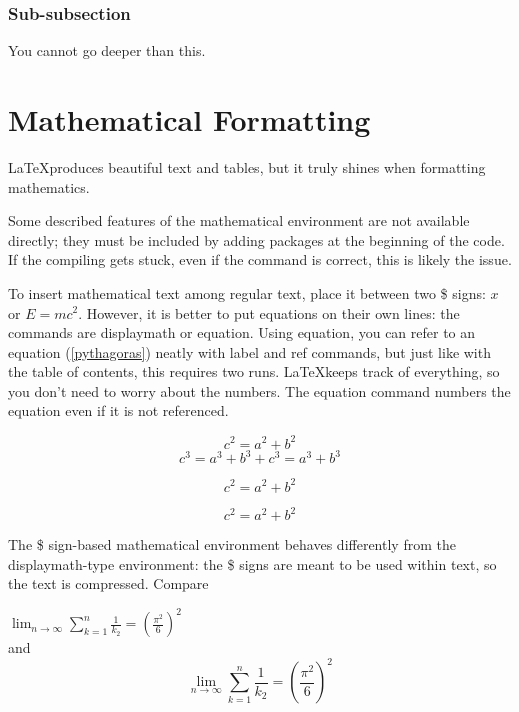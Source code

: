 \documentclass[12pt, titlepage, a4paper]{article}  %
\begin{document}
\subsubsection{Sub-subsection}
You cannot go deeper than this.



\section{Mathematical Formatting}

\LaTeX produces beautiful text and tables, but it truly shines when formatting mathematics.

Some described features of the mathematical environment are not available directly; they must be included by adding packages at the beginning of the code. If the compiling gets stuck, even if the command is correct, this is likely the issue.

To insert mathematical text among regular text, place it between two \$ signs: $x$ or $E=mc^{2}$. However, it is better to put equations on their own lines: the commands are displaymath or equation. Using equation, you can refer to an equation (\ref{pythagoras}) neatly with label and ref commands, but just like with the table of contents, this requires two runs. \LaTeX keeps track of everything, so you don't need to worry about the numbers. The equation command numbers the equation even if it is not referenced.

\begin{displaymath}
c^{2}=a^{2}+b^{2}
\end{displaymath}
\begin{equation} \label{pythagoras2}
c^{3}=a^{3}+b^{3} + c^{3}=a^{3}+b^{3}
\end{equation}

\begin{equation} \label{pythagoras}
c^{2}=a^{2}+b^{2}
\end{equation}

\begin{equation} 
c^{2}=a^{2}+b^{2}
\end{equation}

The \$ sign-based mathematical environment behaves differently from the displaymath-type environment: the \$ signs are meant to be used within text, so the text is compressed. Compare

$\lim_{n \to \infty} \sum_{k=1}^n \frac{1}{k_2} = \left( \frac{\pi^2}{6} \right)^2$ \\
and 
\begin{displaymath}
\lim_{n \to \infty} \sum_{k=1}^n \frac{1}{k_2} = \left( \frac{\pi^2}{6} \right)^2
\end{displaymath}
\end{document}
